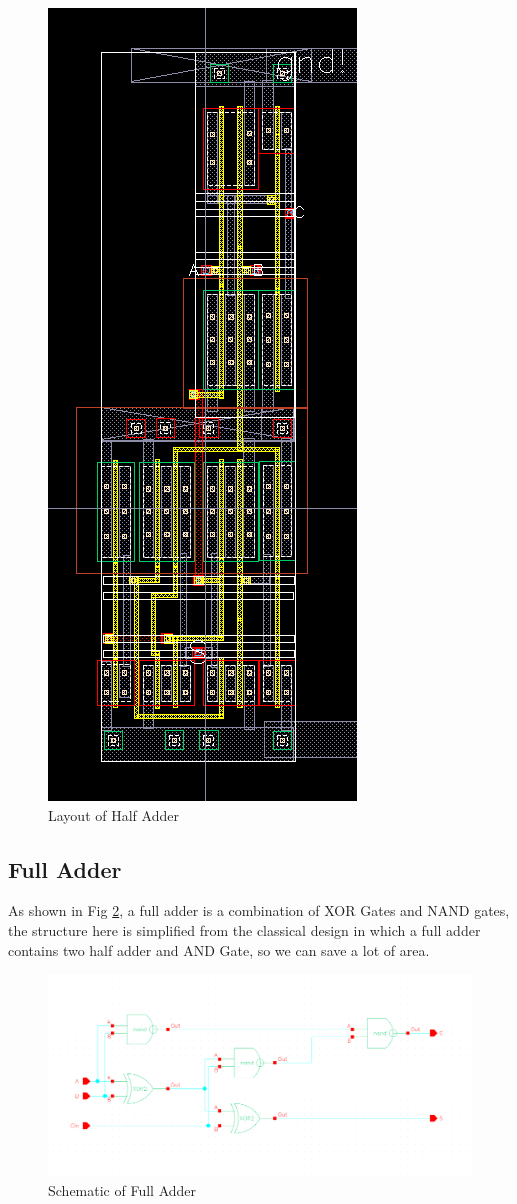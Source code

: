 \documentclass[conference]{IEEEtran}
\begin{document}
\begin{figure}[H]
    \centering
    \includegraphics[width = 0.3\linewidth]{half_adder_layout.png}
    \caption{Layout of Half Adder}
    \label{Layout of Half Adder}
\end{figure}
  
\subsection{Full Adder}


As shown in Fig \ref{Schematic of Full Adder}, a full adder is a combination of XOR Gates and NAND gates, the structure here is simplified from the classical design in which a full adder contains two half adder and AND Gate, so we can save a lot of area.

\begin{figure}[H]
    \centering
    \includegraphics[width = 0.9\linewidth]{full_adder_schematic.png}
    \caption{Schematic of Full Adder}
    \label{Schematic of Full Adder}
\end{figure}
 
\end{document}
